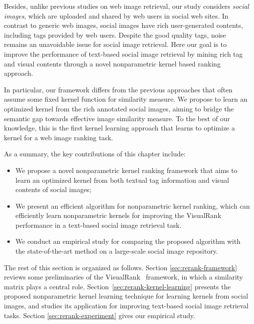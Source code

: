 Besides, unlike previous studies on web image retrieval, our study
considers {\it social images}, which are uploaded and shared by web users
in social web sites. In contrast to generic web images, social images have
rich user-generated contents, including tags provided by web users.
Despite the good quality tags, noise remains an unavoidable issue for
social image retrieval. Here our goal is to improve the
performance of text-based social image retrieval by mining rich tag and
visual contents through a novel nonparametric kernel based ranking
approach.

In particular, our framework differs from the previous approaches that often assume some fixed kernel function for similarity measure. We propose to learn an optimized kernel from the rich annotated social images, aiming to bridge the semantic gap towards effective image similarity measure. To the best of our knowledge, this is the first kernel learning approach that learns to optimize a kernel for a web image ranking task.

As a summary, the key contributions of this chapter include:
\begin{itemize}
  \item We propose a novel nonparametric kernel ranking framework that aims to learn an optimized kernel from both textual tag information and visual contents of social images;

  \item We present an efficient algorithm for nonparametric kernel ranking, which can efficiently learn nonparametric kernels for improving the VisualRank performance in a text-based social image retrieval task.

  \item We conduct an empirical study for comparing the proposed algorithm with the state-of-the-art method on a large-scale social image repository.

\end{itemize}

The rest of this section is organized as follows. Section \ref{sec:rerank-framework} reviews some preliminaries of the VisualRank~\cite{pami/JingB08} framework, in which a similarity matrix plays a central role. Section~\ref{sec:rerank-kernel-learning} presents the proposed nonparametric kernel learning technique for learning kernels from social images, and studies its application for improving text-based social image retrieval tasks. Section \ref{sec:rerank-experiment} gives our empirical study.


